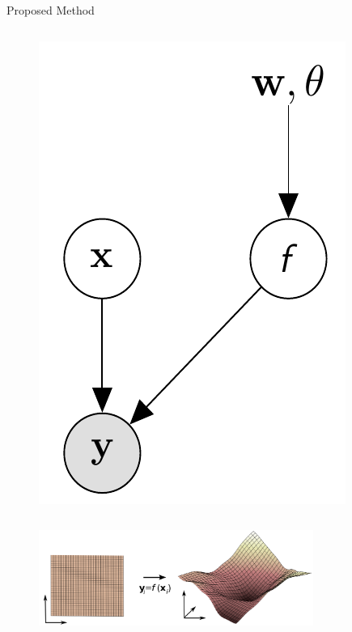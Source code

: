 \documentclass[final,hyperref={pdfpagelabels=false}]{beamer}
\begin{document}
\begin{frame}[t]
\begin{columns}[t]
\begin{column}{0.96\linewidth}
\begin{block}{Proposed Method}
\begin{columns}[t]
\begin{column}{0.33\linewidth}
\begin{columns}
\begin{column}{0.2\textwidth}
\begin{figure}
                \includegraphics[width=\textwidth]{lvm.png}
              \end{figure}
            \end{column}
          \end{columns}
          \begin{figure}
            \centering
            \includegraphics[width=0.8\textwidth]{nonlinearMap.png}
          \end{figure}


\end{column}
\end{columns}
\end{block}
\end{column}
\end{columns}
\end{frame}
\end{document}
